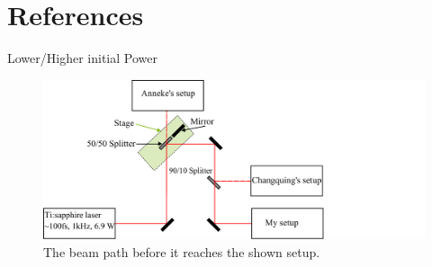 \documentclass[aspectratio=1610, 9pt]{beamer}
\begin{document}
\section{References }
\printbibliography

\begin{frame}{Lower/Higher initial Power}
  \begin{figure}
    \centering
    \includegraphics[width=\textwidth]{images/Aufbau_vor.pdf}
    \caption{The beam path before it reaches the shown setup.}
  \end{figure}
\end{frame} 
\end{document}
